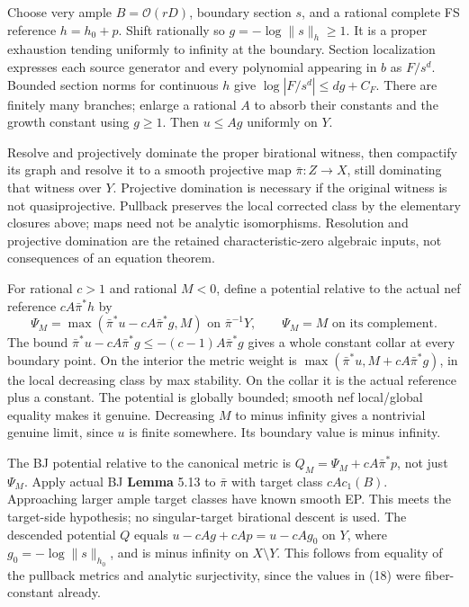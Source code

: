 \documentclass[
  10pt,
]{article}
\begin{document}
Choose very ample \(B=\mathcal O(rD)\), boundary section \(s\), and a
rational complete FS reference \(h=h_0+p\). Shift rationally so
\(g=-\log\|s\|_h\ge1\). It is a proper exhaustion tending uniformly to
infinity at the boundary. Section localization expresses each source
generator and every polynomial appearing in \(b\) as \(F/s^d\). Bounded
section norms for continuous \(h\) give \(\log|F/s^d|\le dg+C_F\). There
are finitely many branches; enlarge a rational \(A\) to absorb their
constants and the growth constant using \(g\ge1\). Then \(u\le Ag\)
uniformly on \(Y\).

Resolve and projectively dominate the proper birational witness, then
compactify its graph and resolve it to a smooth projective map
\(\bar\pi:Z\to X\), still dominating that witness over \(Y\). Projective
domination is necessary if the original witness is not quasiprojective.
Pullback preserves the local corrected class by the elementary closures
above; maps need not be analytic isomorphisms. Resolution and projective
domination are the retained characteristic-zero algebraic inputs, not
consequences of an equation theorem.

For rational \(c>1\) and rational \(M<0\), define a potential relative
to the actual nef reference \(cA\bar\pi^*h\) by
\[\Psi_M=\max(\bar\pi^*u-cA\bar\pi^*g,M)\text{ on }\bar\pi^{-1}Y,
 \qquad\Psi_M=M\text{ on its complement}. \tag{18}\] The bound
\(\bar\pi^*u-cA\bar\pi^*g\le-(c-1)A\bar\pi^*g\) gives a whole constant
collar at every boundary point. On the interior the metric weight is
\(\max(\bar\pi^*u,M+cA\bar\pi^*g)\), in the local decreasing class by
max stability. On the collar it is the actual reference plus a constant.
The potential is globally bounded; smooth nef local/global equality
makes it genuine. Decreasing \(M\) to minus infinity gives a nontrivial
genuine limit, since \(u\) is finite somewhere. Its boundary value is
minus infinity.

The BJ potential relative to the canonical metric is
\(Q_M=\Psi_M+cA\bar\pi^*p\), not just \(\Psi_M\). Apply actual BJ
\textbf{Lemma} 5.13 to \(\bar\pi\) with target class \(cA c_1(B)\).
Approaching larger ample target classes have known smooth EP. This meets
the target-side hypothesis; no singular-target birational descent is
used. The descended potential \(Q\) equals \(u-cAg+cAp=u-cAg_0\) on
\(Y\), where \(g_0=-\log\|s\|_{h_0}\), and is minus infinity on
\(X\setminus Y\). This follows from equality of the pullback metrics and
analytic surjectivity, since the values in (18) were fiber-constant
already.
\end{document}
